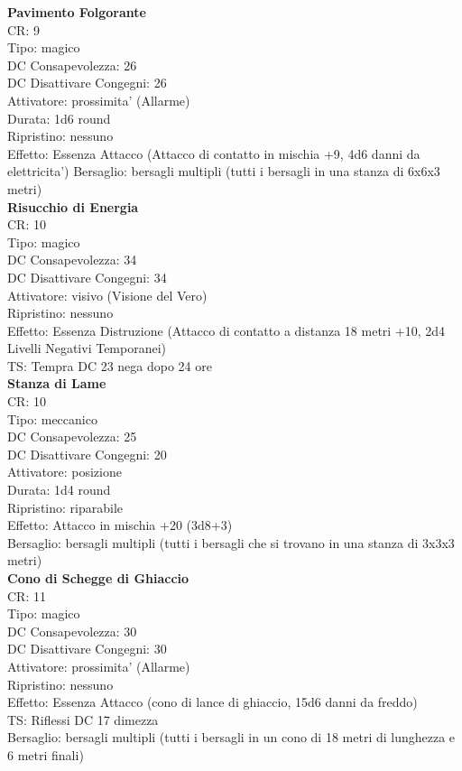 \documentclass[a4paper,11pt,twoside,openany]{dndbook}
\begin{document}
{\begin{multicols}{2}
\textbf{Pavimento Folgorante}\\
CR: 9 \\
Tipo: magico \\
DC Consapevolezza: 26 \\
DC Disattivare Congegni: 26 \\
Attivatore: prossimita' (Allarme) \\
Durata: 1d6 round \\
Ripristino: nessuno \\
Effetto: Essenza Attacco (Attacco di contatto in mischia +9, 4d6 danni da elettricita') 
Bersaglio: bersagli multipli (tutti i bersagli in una stanza di 6x6x3 metri)\\

\textbf{Risucchio di Energia}\\
CR: 10 \\
Tipo: magico \\
DC Consapevolezza: 34 \\
DC Disattivare Congegni: 34 \\
Attivatore: visivo (Visione del Vero) \\
Ripristino: nessuno \\
Effetto: Essenza Distruzione (Attacco di contatto a distanza 18 metri +10, 2d4 Livelli Negativi Temporanei) \\
TS: Tempra DC 23 nega dopo 24 ore\\

\textbf{Stanza di Lame}\\
CR: 10 \\
Tipo: meccanico \\
DC Consapevolezza: 25 \\
DC Disattivare Congegni: 20 \\
Attivatore: posizione \\
Durata: 1d4 round \\
Ripristino: riparabile \\
Effetto: Attacco in mischia +20 (3d8+3) \\
Bersaglio: bersagli multipli (tutti i bersagli che si trovano in una stanza di 3x3x3 metri)\\

\textbf{Cono di Schegge di Ghiaccio}\\
CR: 11 \\
Tipo: magico \\
DC Consapevolezza: 30 \\
DC Disattivare Congegni: 30 \\
Attivatore: prossimita' (Allarme) \\
Ripristino: nessuno \\
Effetto: Essenza Attacco (cono di lance di ghiaccio, 15d6 danni da freddo) \\
TS: Riflessi DC 17 dimezza \\
Bersaglio: bersagli multipli (tutti i bersagli in un cono di 18 metri di lunghezza e 6 metri finali)\\


\end{multicols}}
\end{document}
